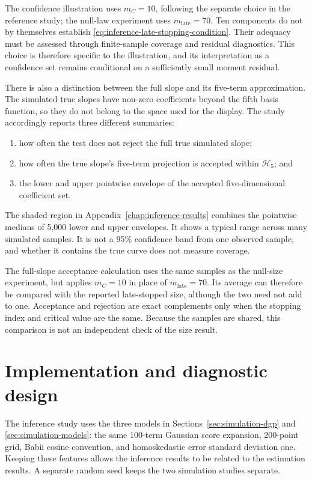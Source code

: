 The confidence illustration uses $m_C=10$, following the separate choice in
the reference study; the null-law experiment uses
$m_{\mathrm{late}}=70$.  Ten components do not by themselves establish
\eqref{eq:inference-late-stopping-condition}.  Their adequacy must be assessed
through finite-sample coverage and residual diagnostics.  This choice is
therefore specific to the illustration, and its interpretation as a
confidence set remains conditional on a sufficiently small moment residual.

There is also a distinction between the full slope and its five-term
approximation.  The simulated true slopes have non-zero coefficients beyond
the fifth basis function, so they do not belong to the space used for the
display.  The study accordingly reports three different summaries:
\begin{enumerate}
    \item how often the test does not reject the full true simulated slope;
    \item how often the true slope's five-term projection is accepted within
          $\mathcal H_5$; and
    \item the lower and upper pointwise envelope of the accepted
          five-dimensional coefficient set.
\end{enumerate}
The shaded region in Appendix~\ref{chap:inference-results} combines the
pointwise medians of 5,000 lower and upper envelopes.  It shows a typical
range across many simulated samples.  It is not a 95\% confidence band from
one observed sample, and whether it contains the true curve does not measure
coverage.

The full-slope acceptance calculation uses the same samples as the null-size
experiment, but applies $m_C=10$ in place of $m_{\mathrm{late}}=70$.  Its
average can therefore be compared with the reported late-stopped size,
although the two need not add to one.  Acceptance and rejection are exact
complements only when the stopping index and critical value are the same.
Because the samples are shared, this comparison is not an independent check
of the size result.

\section{Implementation and diagnostic design}
\label{sec:inference-implementation}

The inference study uses the three models in
Sections~\ref{sec:simulation-dgp} and \ref{sec:simulation-models}: the same
100-term Gaussian score expansion, 200-point grid, Babii cosine convention,
and homoskedastic error standard deviation one.  Keeping these features
allows the inference results to be related to the estimation results.  A
separate random seed keeps the two simulation studies separate.

